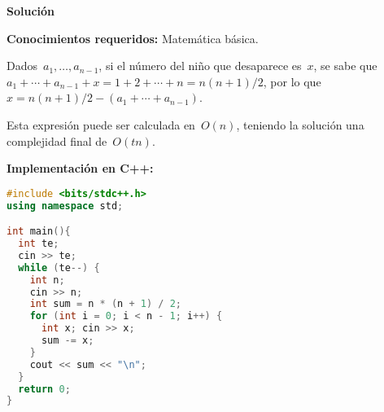 \vspace*{0cm}
{\Large\textbf{Solución}}

\textbf{Conocimientos requeridos:} Matemática básica.

Dados~$a_1, \dots, a_{n-1}$, si el número del niño que desaparece es~$x$, se sabe
que~$a_1 + \cdots + a_{n - 1} + x = 1 + 2 + \cdots + n = n(n + 1) / 2$, por lo
que~$x = n(n + 1) / 2 - (a_1 + \cdots + a_{n - 1})$.

Esta expresión puede ser calculada en~$O(n)$, teniendo la solución una complejidad
final de~$O(tn)$.

\textbf{Implementación en C++:}

\begin{lstlisting}[language=C++]
#include <bits/stdc++.h>
using namespace std;

int main(){
  int te;
  cin >> te;
  while (te--) {
    int n;
    cin >> n;
    int sum = n * (n + 1) / 2;
    for (int i = 0; i < n - 1; i++) {
      int x; cin >> x;
      sum -= x;
    }
    cout << sum << "\n";
  }
  return 0;
}
\end{lstlisting}

\newpage

